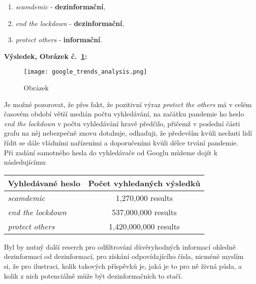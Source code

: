 \begin{enumerate}
\item \textit{scamdemic} - \textbf{dezinformační},
\item \textit{end the lockdown} - \textbf{dezinformační},
\item \textit{protect others} - \textbf{informační}.	
\end{enumerate}
\vspace*{5mm}

\textbf{Výsledek, Obrázek č.~\ref{fig:google trends}:}

\begin{figure}[htbp]
  \centering
  \texttt{[image: google\_trends\_analysis.png]}
  \caption{Obrázek}
  \label{fig:google trends}
\end{figure}

Je možné pozorovat, že přes fakt, že pozitivní výraz \textit{protect the others} má v celém časovém období větší medián počtu vyhledávání, na začátku pandemie ho heslo \textit{end the lockdown} v počtu vyhledávání hravě předčilo, přičemž v poslední části grafu na něj nebezpečně znovu dotahuje, odhaduji, že především kvůli nechuti lidí řídit se dále vládními nařízeními a doporučeními kvůli délce trvání pandemie.\\

Při zadání samotného hesla do vyhledávače od Googlu můžeme dojít k následujícímu:\\

\begin{centering}
\begin{tabular}{l|c}
 \textbf{Vyhledávané heslo} & \textbf{Počet vyhledaných výsledků} \\ 
\hline
\hline
 \textit{scamdemic} & 1,270,000 results \\  
 \textit{end the lockdown} & 537,000,000 results \\
 \textit{protect others} & 1,420,000,000 results \\
\hline
\hline    
\end{tabular}
  \label{tbl:odkaz}
\end{centering}
\vspace*{5mm}

Byl by nutný další reserch pro odfiltrování důvěryhodných informací ohledně dezinformací od dezinformací, pro získání odpovídajícího čísla, nicméně myslím si, že pro ilustraci, kolik takových příspěvků je, jaká je to pro ně živná půda, a kolik z nich potenciálně může být dezinformačních to stačí.\\

